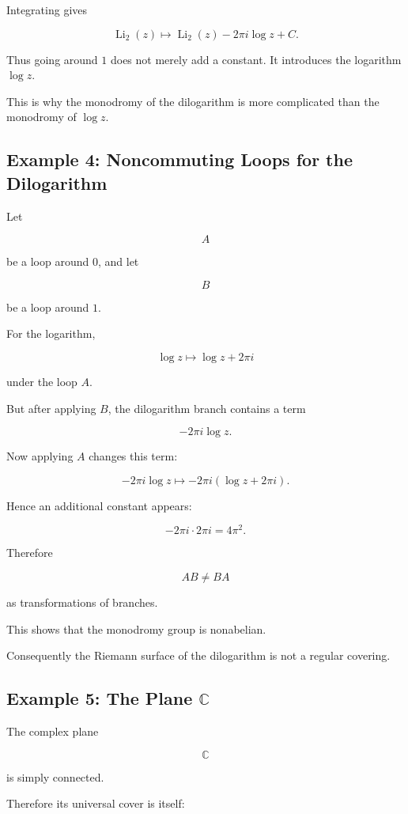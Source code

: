 \documentclass[12pt,a4paper]{article}
\theoremstyle{notespace}
\begin{document}
Integrating gives

\[
\operatorname{Li}_2(z)
\mapsto
\operatorname{Li}_2(z)
-
2\pi i \log z
+
C.
\]

Thus going around \(1\) does not merely add a constant. It introduces the logarithm \(\log z\).

This is why the monodromy of the dilogarithm is more complicated than the monodromy of \(\log z\).

\subsection{Example 4: Noncommuting Loops for the Dilogarithm}

Let

\[
A
\]

be a loop around \(0\), and let

\[
B
\]

be a loop around \(1\).

For the logarithm,

\[
\log z
\mapsto
\log z+2\pi i
\]

under the loop \(A\).

But after applying \(B\), the dilogarithm branch contains a term

\[
-2\pi i\log z.
\]

Now applying \(A\) changes this term:

\[
-2\pi i\log z
\mapsto
-2\pi i(\log z+2\pi i).
\]

Hence an additional constant appears:

\[
-2\pi i\cdot 2\pi i
=
4\pi^2.
\]

Therefore

\[
AB\neq BA
\]

as transformations of branches.

This shows that the monodromy group is nonabelian.

Consequently the Riemann surface of the dilogarithm is not a regular covering.

\subsection{Example 5: The Plane \(\mathbb C\)}

The complex plane

\[
\mathbb C
\]

is simply connected.

Therefore its universal cover is itself:
\end{document}
